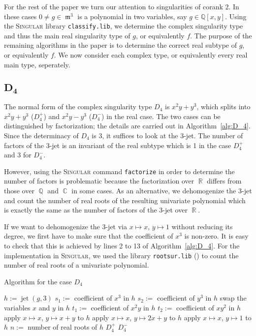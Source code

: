 \documentclass[noend]{amsproc}
\theoremstyle{definition}
\newcommand{\Singular}{\textsc{Singular}}
\DeclareMathOperator{\m}{\mathfrak{m}}
\DeclareMathOperator{\jet}{jet}
\DeclareMathOperator{\Q}{\mathbb{Q}}
\DeclareMathOperator{\R}{\mathbb{R}}
\DeclareMathOperator{\C}{\mathbb{C}}
\begin{document}
For the rest of the paper we turn our attention to singularities of corank $2$.
In these cases $0\neq g\in\m^3$ is a polynomial in two variables, say
$g\in\mathbb Q[x,y]$. Using the \textsc{Singular} library {\tt classify.lib},
we determine the complex singularity type and thus the main real singularity
type of $g$, or equivalently $f$. The purpose of the remaining algorithms in
the paper is to determine the correct real subtype of $g$, or equivalently $f$.
We now consider each complex type, or equivalently every real main type,
seperately.

\subsection{$\boldsymbol{D_4}$}

The normal form of the complex singularity type $D_4$ is $x^2y+y^3$, which
splits into $x^2y+y^3$ ($D_4^+$) and $x^2y-y^3$ ($D_4^-$) in the real case.
The two cases can be distinguished by factorization; the details are carried
out in Algorithm~\ref{alg:D_4}. Since the determinacy of $D_4$ is $3$, it
suffices to look at the $3$-jet. The number of factors of the 3-jet is an
invariant of the real subtype which is 1 in the case $D_4^+$ and 3 for $D_4^-$.

However, using the \Singular{} command \verb+factorize+ in order to determine
the number of factors is problematic because the factorization over $\R$
differs from those over $\Q$ and $\C$ in some cases. As an alternative, we
dehomogenize the 3-jet and count the number of real roots of the resulting
univariate polynomial which is exactly the same as the number of factors of the
3-jet over $\R$.

If we want to dehomogenize the 3-jet via $x\mapsto x$, $y\mapsto 1$ without
reducing its degree, we first have to make sure that the coefficient of $x^3$
is non-zero. It is easy to check that this is achieved by lines 2 to 13 of
Algorithm~\ref{alg:D_4}. For the implementation in \Singular{}, we used the
library \texttt{rootsur.lib} (\cite{roots}) to count the number of real roots
of a univariate polynomial.

\begin{algorithm}[ht]
\caption{\label{alg:D_4}\label{D[4]} Algorithm for the case $D_4$}
\begin{algorithmic}[1]

\REQUIRE{$g\in \m^3\subset\mathbb Q[x,y]$ of complex singularity type $D_4$}
\STATE $h := \jet(g,3)$
\STATE $s_1:=$ coefficient of ${x^3}$ in $h$
\STATE $s_2 :=$ coefficient of ${y^3}$ in $h$
\STATE swap the variables $x$ and $y$ in $h$
\ELSE
\STATE $t_1:=$ coefficient of ${x^2y}$ in $h$
\STATE $t_2:=$ coefficient of ${xy^2}$ in $h$
\STATE apply $x\mapsto x$, $y\mapsto x+y$ to $h$
\ELSE
\STATE apply $x\mapsto x$, $y\mapsto 2x+y$ to $h$
\ENDIF
\ENDIF
\ENDIF
\STATE apply $x\mapsto x$, $y\mapsto 1$ to $h$
\STATE $n :=$ number of real roots of $h$
\RETURN $D_4^+$
\ELSE
\RETURN $D_4^-$
\ENDIF

\end{algorithmic}
\end{algorithm}
\end{document}
